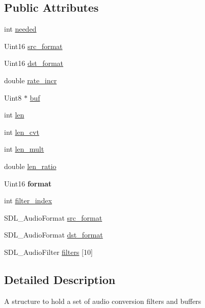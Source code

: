 \subsection*{Public Attributes}
\begin{DoxyCompactItemize}
\item 
int \hyperlink{structSDL__AudioCVT_ac600a035a48df05e14d3712fd6953ad4}{needed}
\item 
Uint16 \hyperlink{structSDL__AudioCVT_a6ae81231e017105e6d5e745a51732e16}{src\+\_\+format}
\item 
Uint16 \hyperlink{structSDL__AudioCVT_a8f890d017be857a3b048bf00525736c6}{dst\+\_\+format}
\item 
double \hyperlink{structSDL__AudioCVT_ad886122c23a6673073baace31bff3b6c}{rate\+\_\+incr}
\item 
Uint8 $\ast$ \hyperlink{structSDL__AudioCVT_af42eb88b79cf9180670a5122c2c82671}{buf}
\item 
int \hyperlink{structSDL__AudioCVT_aeaeb8c5a63c3ab96471fbfdf412c78ff}{len}
\item 
int \hyperlink{structSDL__AudioCVT_a5c60163f34d1947e5b166c23aba9879d}{len\+\_\+cvt}
\item 
int \hyperlink{structSDL__AudioCVT_ac9662d47cf2348b82b27b151150116b0}{len\+\_\+mult}
\item 
double \hyperlink{structSDL__AudioCVT_a5628ff5ccf711de9d77c0a4a9f57d2f0}{len\+\_\+ratio}
\item 
\hypertarget{structSDL__AudioCVT_a020b6e1c01089169921ddb0c1e7f08d2}{Uint16 {\bfseries format}}\label{structSDL__AudioCVT_a020b6e1c01089169921ddb0c1e7f08d2}

\item 
int \hyperlink{structSDL__AudioCVT_a35093b3ad3331c17416c593a76012b63}{filter\+\_\+index}
\item 
S\+D\+L\+\_\+\+Audio\+Format \hyperlink{structSDL__AudioCVT_a6ae81231e017105e6d5e745a51732e16}{src\+\_\+format}
\item 
S\+D\+L\+\_\+\+Audio\+Format \hyperlink{structSDL__AudioCVT_a8f890d017be857a3b048bf00525736c6}{dst\+\_\+format}
\item 
S\+D\+L\+\_\+\+Audio\+Filter \hyperlink{structSDL__AudioCVT_aa9b3c25dcbfc957dd439a34fcd3ff608}{filters} \mbox{[}10\mbox{]}
\end{DoxyCompactItemize}


\subsection{Detailed Description}
A structure to hold a set of audio conversion filters and buffers 

